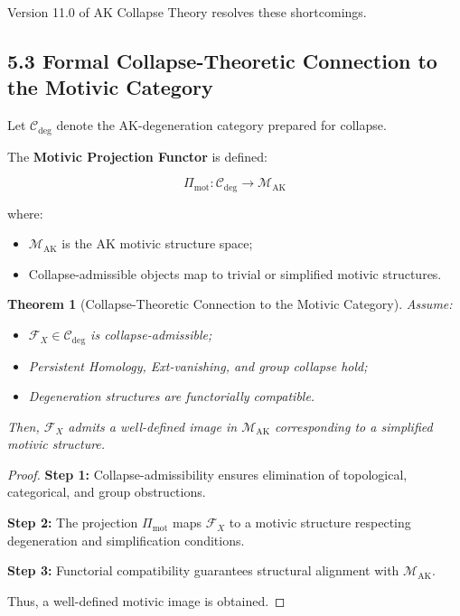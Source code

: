 \documentclass[11pt]{article}
\newtheorem{theorem}{Theorem}[section]
\begin{document}
Version 11.0 of AK Collapse Theory resolves these shortcomings.

\subsection{5.3 Formal Collapse-Theoretic Connection to the Motivic Category}

Let $\mathcal{C}_{\mathrm{deg}}$ denote the AK-degeneration category prepared for collapse.

The \textbf{Motivic Projection Functor} is defined:

\begin{equation}
\Pi_{\mathrm{mot}} : \mathcal{C}_{\mathrm{deg}} \longrightarrow \mathcal{M}_{\mathrm{AK}}
\end{equation}

where:

\begin{itemize}
    \item $\mathcal{M}_{\mathrm{AK}}$ is the AK motivic structure space;
    \item Collapse-admissible objects map to trivial or simplified motivic structures.
\end{itemize}

\begin{theorem}[Collapse-Theoretic Connection to the Motivic Category]
Assume:

\begin{itemize}
    \item $\mathcal{F}_X \in \mathcal{C}_{\mathrm{deg}}$ is collapse-admissible;
    \item Persistent Homology, Ext-vanishing, and group collapse hold;
    \item Degeneration structures are functorially compatible.
\end{itemize}

Then, $\mathcal{F}_X$ admits a well-defined image in $\mathcal{M}_{\mathrm{AK}}$ corresponding to a simplified motivic structure.
\end{theorem}

\begin{proof}
\textbf{Step 1:} Collapse-admissibility ensures elimination of topological, categorical, and group obstructions.

\textbf{Step 2:} The projection $\Pi_{\mathrm{mot}}$ maps $\mathcal{F}_X$ to a motivic structure respecting degeneration and simplification conditions.

\textbf{Step 3:} Functorial compatibility guarantees structural alignment with $\mathcal{M}_{\mathrm{AK}}$.

Thus, a well-defined motivic image is obtained.
\end{proof}
\end{document}

